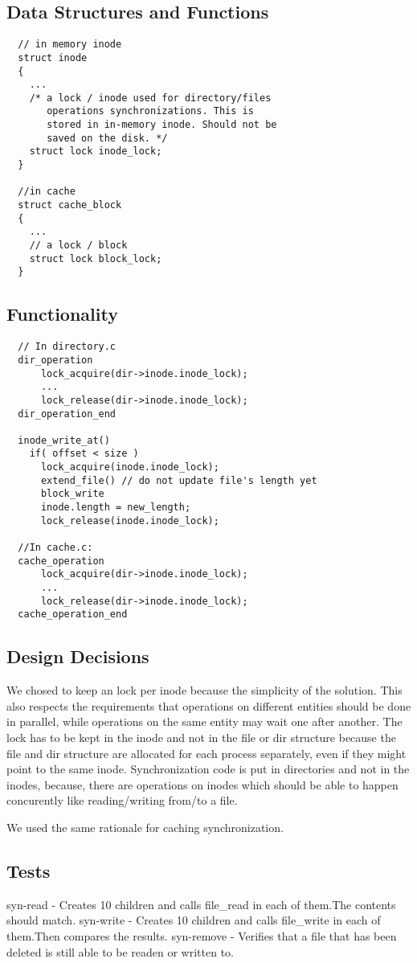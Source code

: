 \subsection{Data Structures and Functions}
  
\begin{lstlisting}
  // in memory inode 
  struct inode 
  {
    ...
    /* a lock / inode used for directory/files
       operations synchronizations. This is 
       stored in in-memory inode. Should not be
       saved on the disk. */
    struct lock inode_lock; 
  }

  //in cache
  struct cache_block
  {
    ... 
    // a lock / block 
    struct lock block_lock;
  }

\end{lstlisting}

\subsection{Functionality}
  
\begin{lstlisting}
  // In directory.c
  dir_operation
      lock_acquire(dir->inode.inode_lock);
      ...
      lock_release(dir->inode.inode_lock);
  dir_operation_end

  inode_write_at()
    if( offset < size )
      lock_acquire(inode.inode_lock);
      extend_file() // do not update file's length yet
      block_write
      inode.length = new_length;
      lock_release(inode.inode_lock);
    
  //In cache.c:
  cache_operation
      lock_acquire(dir->inode.inode_lock);
      ...
      lock_release(dir->inode.inode_lock);
  cache_operation_end

\end{lstlisting}

\subsection{Design Decisions}
  
We chosed to keep an lock per inode because the simplicity of the solution. This also respects the requirements that operations on different entities should be done in parallel, while operations on the same entity may wait one after another. The lock has to be kept in the inode and not in the file or dir structure because the file and dir structure are allocated for each process separately, even if they might point to the same inode.
Synchronization code is put in directories and not in the inodes, because, there are operations on inodes which should be able to happen concurently like reading/writing from/to a file.

We used the same rationale for caching synchronization.

\subsection{Tests}

syn-read - Creates 10 children and calls file\_read in each of them.The contents should match.
syn-write - Creates 10 children and calls file\_write in each of them.Then compares the results.
syn-remove - Verifies that a file that has been deleted is still able to be readen or written to.